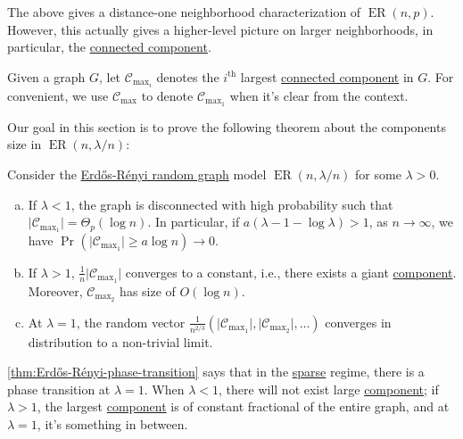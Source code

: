 The above gives a distance-one neighborhood characterization of \(\operatorname{ER}(n, p)\). However, this actually gives a higher-level picture on larger neighborhoods, in particular, the \hyperref[def:connected-component]{connected component}.

\begin{notation}
	Given a graph \(G\), let \(\mathcal{C} _{\max _i}\) denotes the \(i^{\text{th} }\) largest \hyperref[def:connected-component]{connected component} in \(G\). For convenient, we use \(\mathcal{C} _{\max }\) to denote \(\mathcal{C} _{\max _1}\) when it's clear from the context.
\end{notation}

Our goal in this section is to prove the following theorem about the components size in \(\operatorname{ER}(n, \lambda / n) \):

\begin{theorem}\label{thm:Erdős-Rényi-phase-transition}
	Consider the \hyperref[def:Erdős-Rényi-random-graph]{Erdős-Rényi random graph} model \(\operatorname{ER}(n, \lambda / n)\) for some \(\lambda > 0\).
	\begin{enumerate}[(a)]
		\item\label{thm:Erdős-Rényi-phase-transition-a} If \(\lambda < 1\), the graph is disconnected with high probability such that \(\lvert \mathcal{C} _{\max _1} \rvert = \Theta _p (\log n)\). In particular, if \(a (\lambda - 1 - \log \lambda ) > 1\), as \(n \to \infty \), we have \(\Pr_{}\left( \lvert \mathcal{C} _{\max _1} \rvert \geq  a \log n \right) \to 0\).
		\item\label{thm:Erdős-Rényi-phase-transition-b} If \(\lambda > 1\), \(\frac{1}{n} \lvert \mathcal{C} _{\max _1} \rvert \) converges to a constant, i.e., there exists a giant \hyperref[def:connected-component]{component}. Moreover, \(\mathcal{C} _{\max _2}\) has size of \(O(\log n)\).
		\item\label{thm:Erdős-Rényi-phase-transition-c} At \(\lambda = 1\), the random vector \(\frac{1}{n^{2 / 3}} (\lvert \mathcal{C} _{\max _1} \rvert , \lvert \mathcal{C} _{\max _2} \rvert , \dots )\) converges in distribution to a non-trivial limit.
	\end{enumerate}
\end{theorem}

\autoref{thm:Erdős-Rényi-phase-transition} says that in the \hyperref[def:sparse-graph]{sparse} regime, there is a phase transition at \(\lambda = 1\). When \(\lambda < 1\), there will not exist large \hyperref[def:connected-component]{component}; if \(\lambda > 1\), the largest \hyperref[def:connected-component]{component} is of constant fractional of the entire graph, and at \(\lambda = 1\), it's something in between.


